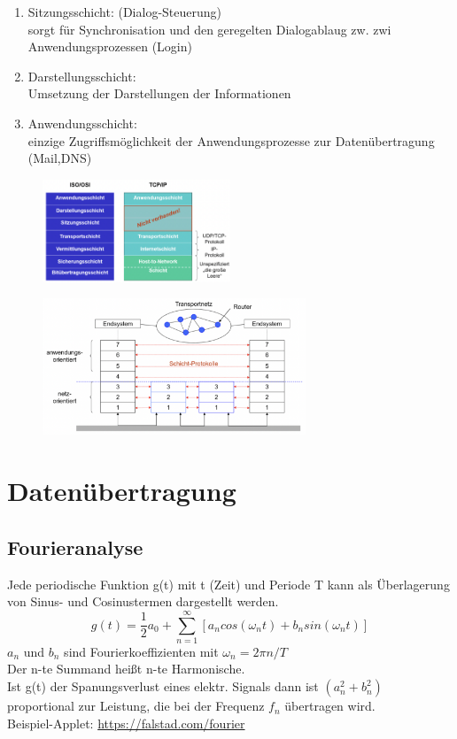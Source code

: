 \documentclass{scrreprt}
\begin{document}
\begin{itemize}
\begin{enumerate}
		\item Sitzungsschicht: (Dialog-Steuerung)
		\\sorgt für Synchronisation und den geregelten Dialogablaug zw. zwi Anwendungsprozessen (Login)
		\item Darstellungsschicht: 
		\\Umsetzung der Darstellungen der Informationen
		\item Anwendungsschicht:
		\\einzige Zugriffsmöglichkeit der Anwendungsprozesse zur Datenübertragung (Mail,DNS)
	\end{enumerate}
	\begin{figure}[h]
		\includegraphics[width=0.50\textwidth]{"graphics/IOSTCP"}
		\centering
	\end{figure}
	\begin{figure}[h]
		\includegraphics[width=0.70\textwidth]{"graphics/ISO2"}
		\centering
	\end{figure}
\end{itemize}

\chapter{Datenübertragung}
\section{Fourieranalyse}
\label{sec:fourier}
Jede periodische Funktion g(t) mit t (Zeit) und Periode T kann als Überlagerung
von Sinus- und Cosinustermen dargestellt werden.
$$g(t)=\frac{1}{2}a_{0}+\sum_{n=1}^{\infty}{[a_{n}cos(\omega_{n}t)+b_{n}sin(\omega_{n}t)]}$$
$a_{n}$ und $b_{n}$ sind Fourierkoeffizienten mit $\omega_{n}=2\pi n/T $
\\
Der n-te Summand heißt n-te Harmonische.
\\
Ist g(t) der Spanungsverlust eines elektr. Signals dann ist $(a_{n}^{2}+b_{n}^{2})$ proportional
zur Leistung, die bei der Frequenz $f_{n}$ übertragen wird.
\\
Beispiel-Applet: \url{https://falstad.com/fourier}
\end{document}
